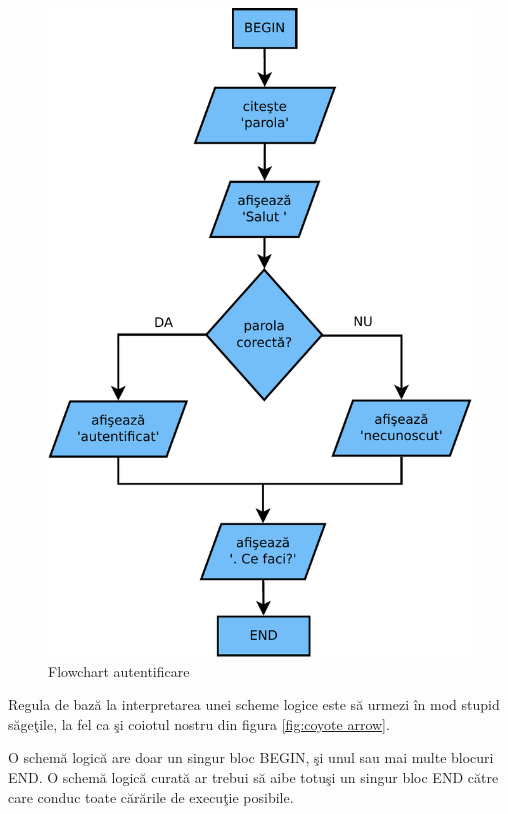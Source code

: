 \begin{figure}[h!]
  \centering
    \includegraphics[scale=.5]{cap02/flowchart1-crop.pdf}
  \caption{Flowchart autentificare}
  \label{fig:flowchart authenticated}
\end{figure}

Regula de bază la interpretarea unei scheme logice
este să urmezi în mod stupid săgeţile, la fel ca şi
coiotul nostru din figura \ref{fig:coyote arrow}.

O schemă logică are doar un singur bloc {\glqq}BEGIN{\grqq}, şi unul
sau mai multe blocuri {\glqq}END{\grqq}. O schemă logică curată
ar trebui să aibe totuşi un singur bloc {\glqq}END{\grqq}
către care conduc toate {\glqq}cărările{\grqq} de execuţie posibile.

